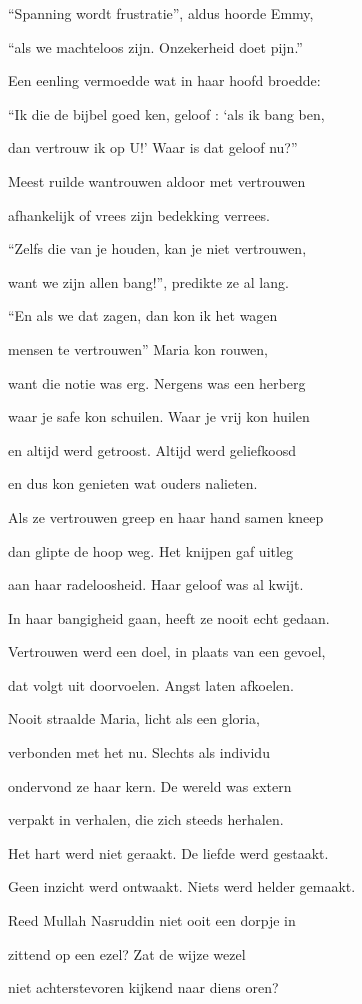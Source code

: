 “Spanning wordt frustratie”,
aldus hoorde Emmy,

“als we machteloos zijn.
Onzekerheid doet pijn.”

Een eenling vermoedde
wat in haar hoofd broedde:

“Ik die de bijbel goed ken,
geloof : ‘als ik bang ben,

dan vertrouw ik op U!’
Waar is dat geloof nu?”

Meest ruilde wantrouwen
aldoor met vertrouwen

afhankelijk of vrees
zijn bedekking verrees.

“Zelfs die van je houden,
kan je niet vertrouwen,

want we zijn allen bang!”,
predikte ze al lang.

“En als we dat zagen,
dan kon ik het wagen

mensen te vertrouwen”
Maria kon rouwen,

want die notie was erg.
Nergens was een herberg

waar je safe kon schuilen.
Waar je vrij kon huilen

en altijd werd getroost.
Altijd werd geliefkoosd

en dus kon genieten
wat ouders nalieten.

Als ze vertrouwen greep
en haar hand samen kneep

dan glipte de hoop weg.
Het knijpen gaf uitleg

aan haar radeloosheid.
Haar geloof was al kwijt.

In haar bangigheid gaan,
heeft ze nooit echt gedaan.

Vertrouwen werd een doel,
in plaats van een gevoel,

dat volgt uit doorvoelen.
Angst laten afkoelen.

Nooit straalde Maria,
licht als een gloria,

verbonden met het nu.
Slechts als individu

ondervond ze haar kern.
De wereld was extern

verpakt in verhalen,
die zich steeds herhalen.

Het hart werd niet geraakt.
De liefde werd gestaakt.

Geen inzicht werd ontwaakt.
Niets werd helder gemaakt.

Reed Mullah Nasruddin
niet ooit een dorpje in

zittend op een ezel?
Zat de wijze wezel

niet achterstevoren
kijkend naar diens oren?

